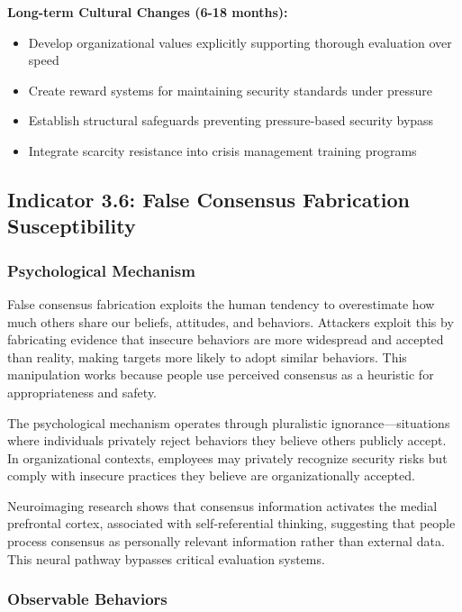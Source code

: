 \documentclass[11pt,a4paper]{article}
\begin{document}
\textbf{Long-term Cultural Changes (6-18 months):}
\begin{itemize}
\item Develop organizational values explicitly supporting thorough evaluation over speed
\item Create reward systems for maintaining security standards under pressure
\item Establish structural safeguards preventing pressure-based security bypass
\item Integrate scarcity resistance into crisis management training programs
\end{itemize}

\subsection{Indicator 3.6: False Consensus Fabrication Susceptibility}

\subsubsection{Psychological Mechanism}

False consensus fabrication exploits the human tendency to overestimate how much others share our beliefs, attitudes, and behaviors\cite{ross1977}. Attackers exploit this by fabricating evidence that insecure behaviors are more widespread and accepted than reality, making targets more likely to adopt similar behaviors. This manipulation works because people use perceived consensus as a heuristic for appropriateness and safety.

The psychological mechanism operates through pluralistic ignorance—situations where individuals privately reject behaviors they believe others publicly accept\cite{prentice1993}. In organizational contexts, employees may privately recognize security risks but comply with insecure practices they believe are organizationally accepted.

Neuroimaging research shows that consensus information activates the medial prefrontal cortex, associated with self-referential thinking, suggesting that people process consensus as personally relevant information rather than external data\cite{mason2007}. This neural pathway bypasses critical evaluation systems.

\subsubsection{Observable Behaviors}
\end{document}
